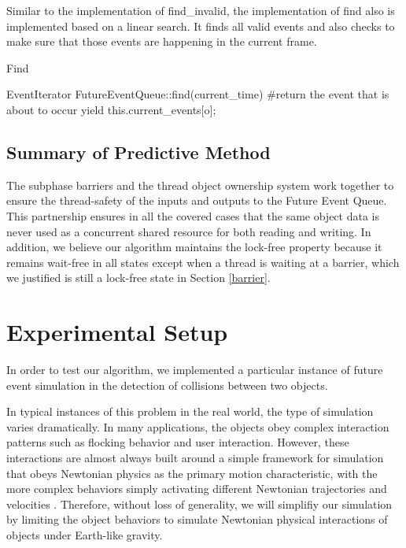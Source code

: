 \documentclass[conference]{IEEEtran}
\begin{document}
Similar to the implementation of find\_invalid, the implementation of find also is implemented based on a linear search.  It finds all valid events
and also checks to make sure that those events are happening in the current frame.

\begin{algorithm}
\caption{Find}
\begin{algorithmic}
\STATE EventIterator FutureEventQueue::find(current\_time)
		\STATE #return the event that is about to occur
		\STATE yield this.current\_events[o];
	\ENDIF
\ENDFOR
\end{algorithmic}
\end{algorithm}

\subsection{Summary of Predictive Method}
	The subphase barriers and the thread object ownership system work together to ensure the thread-safety of the inputs and outputs to the Future Event Queue.
This partnership ensures in all the covered cases that the same object data is never used as a concurrent shared resource for both reading and writing.  In addition, we believe our algorithm maintains
the lock-free property because it remains wait-free in all states except when a thread is waiting at a barrier, which we justified is still a lock-free state in Section \ref{barrier}.

\section{Experimental Setup}%

In order to test our algorithm, we implemented a particular instance of future event simulation in the detection of collisions between two objects.

In typical instances of this problem in the real world, the type of simulation varies dramatically. In many applications, the objects obey complex interaction patterns such as flocking behavior and user interaction.  However, these interactions are almost always built around a simple framework for simulation that obeys Newtonian physics as the primary motion characteristic, with the more complex
behaviors simply activating different Newtonian trajectories and velocities \cite{Jadbabaie02coordinationof}.  Therefore, without loss of generality, we will simplifiy our simulation by limiting the object behaviors to simulate Newtonian physical interactions of objects under Earth-like gravity.
\end{document}
